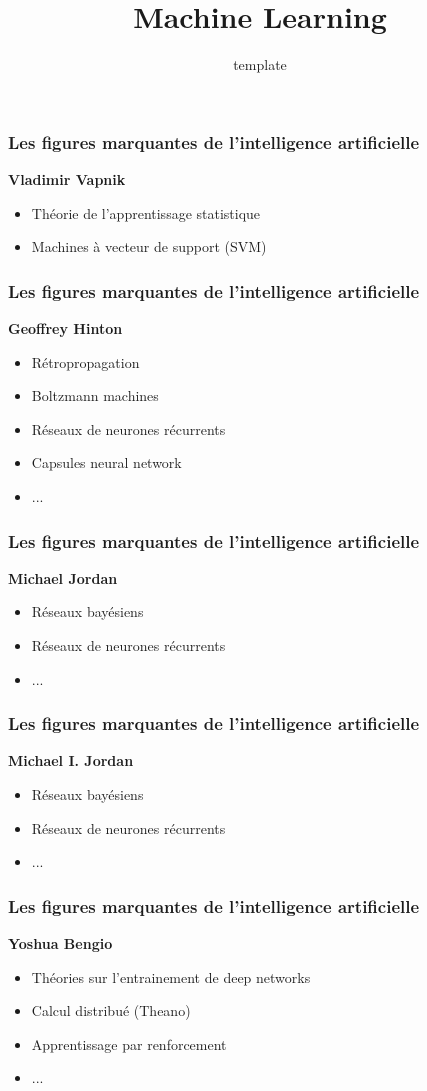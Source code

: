 \documentclass{formation}
\title{Machine Learning}
\subtitle{template}
\begin{document}
\maketitle
\begin{frame}
  \frametitle{Les figures marquantes de l'intelligence artificielle}
  \textbf{Vladimir Vapnik}
  \begin{itemize}
  \item Théorie de l'apprentissage statistique
  \item Machines à vecteur de support (SVM)
  \end{itemize}
\end{frame}

\begin{frame}
  \frametitle{Les figures marquantes de l'intelligence artificielle}
  \textbf{Geoffrey Hinton}
  \begin{itemize}
  \item Rétropropagation
  \item Boltzmann machines
  \item Réseaux de neurones récurrents
  \item Capsules neural network
  \item ...
  \end{itemize}
\end{frame}

\begin{frame}
  \frametitle{Les figures marquantes de l'intelligence artificielle}
  \textbf{Michael Jordan}
  \begin{itemize}
  \item Réseaux bayésiens
  \item Réseaux de neurones récurrents
  \item ...
  \end{itemize}
\end{frame}

\begin{frame}
  \frametitle{Les figures marquantes de l'intelligence artificielle}
  \textbf{Michael I. Jordan}
  \begin{itemize}
  \item Réseaux bayésiens
  \item Réseaux de neurones récurrents
  \item ...
  \end{itemize}
\end{frame}

\begin{frame}
  \frametitle{Les figures marquantes de l'intelligence artificielle}
  \textbf{Yoshua Bengio}
  \begin{itemize}
  \item Théories sur l'entrainement de deep networks
  \item Calcul distribué (Theano)
  \item Apprentissage par renforcement
  \item ...
  \end{itemize}
\end{frame}
\end{document}
